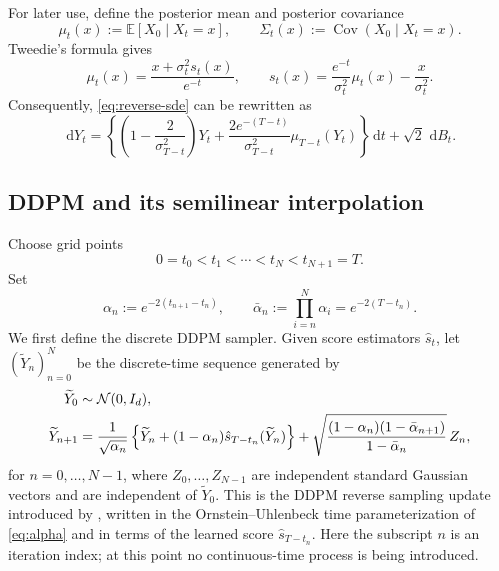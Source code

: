 \documentclass[11pt]{article}
\theoremstyle{definition}
\newcommand{\E}{\mathbb{E}}
\newcommand{\N}{\mathcal{N}}
\newcommand{\Id}{I_d}
\newcommand{\Cov}{\operatorname{Cov}}
\newcommand{\dd}{\,\mathrm{d}}
\begin{document}
For later use, define the posterior mean and posterior covariance
\begin{equation}
    \mu_t(x):=\E\left[X_0\mid X_t=x\right],
    \qquad
    \Sigma_t(x):=\Cov(X_0\mid X_t=x).
    \label{eq:posterior-defs}
\end{equation}
Tweedie's formula \citep{efron2011tweedie} gives
\begin{equation}
    \mu_t(x)=\frac{x+\sigma_t^2s_t(x)}{e^{-t}},
    \qquad
    s_t(x)=\frac{e^{-t}}{\sigma_t^2}\mu_t(x)-\frac{x}{\sigma_t^2}.
    \label{eq:tweedie}
\end{equation}
Consequently, \eqref{eq:reverse-sde} can be rewritten as
\begin{equation}
    \dd Y_t=
    \left\{
       \left(1-\frac{2}{\sigma_{T-t}^2}\right)Y_t
       +\frac{2e^{-(T-t)}}{\sigma_{T-t}^2}\mu_{T-t}(Y_t)
    \right\}\dd t+\sqrt{2}\,\dd B_t.
    \label{eq:reverse-posterior}
\end{equation}

\subsection{DDPM and its semilinear interpolation}

Choose grid points
\begin{equation}
    0=t_0<t_1<\cdots<t_N<t_{N+1}=T.
    \label{eq:grid}
\end{equation}
Set
\begin{equation}
    \alpha_n:=e^{-2(t_{n+1}-t_n)},
    \qquad
    \bar\alpha_n:=\prod_{i=n}^{N}\alpha_i=e^{-2(T-t_n)}.
    \label{eq:alpha}
\end{equation}
We first define the discrete DDPM sampler. Given score estimators
$\hat s_t$, let $(\widetilde Y_n)_{n=0}^N$ be the discrete-time
sequence generated by
\begin{align}
    \widetilde Y_0&\sim\N(0,\Id),\notag\\
    \widetilde Y_{n+1}
    &=\frac{1}{\sqrt{\alpha_n}}
       \left\{\widetilde Y_n+(1-\alpha_n)
       \hat s_{T-t_n}(\widetilde Y_n)\right\}
       +\sqrt{\frac{(1-\alpha_n)(1-\bar\alpha_{n+1})}
       {1-\bar\alpha_n}}\,Z_n,
\label{eq:ddpm-update}
\end{align}
for $n=0,\ldots,N-1$, where $Z_0,\dots,Z_{N-1}$ are independent
standard Gaussian vectors and are independent of $\widetilde Y_0$.
This is the DDPM reverse sampling update introduced by
\citet{ho2020ddpm}, written in the Ornstein--Uhlenbeck time
parameterization of \eqref{eq:alpha} and in terms of the learned
score $\hat s_{T-t_n}$.
Here the subscript $n$ is an iteration index; at this point no
continuous-time process is being introduced.
\end{document}
